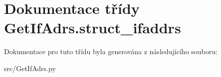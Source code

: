 \hypertarget{classGetIfAdrs_1_1struct__ifaddrs}{\section{Dokumentace třídy Get\-If\-Adrs.\-struct\-\_\-ifaddrs}
\label{dc/dd7/classGetIfAdrs_1_1struct__ifaddrs}
}


Dokumentace pro tuto třídu byla generována z následujícího souboru\-:\begin{DoxyCompactItemize}
\item 
src/Get\-If\-Adrs.\-py\end{DoxyCompactItemize}
